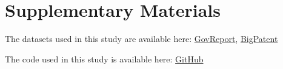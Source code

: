 

\section*{Supplementary Materials}

	The datasets used in this study are available here:
	\href{https://gov-report-data.github.io/}{GovReport},
	\href{https://evasharma.github.io/bigpatent/}{BigPatent}

	The code used in this study is available here:
	\href{https://github.com/NamanChhibbar/Long-Document-Summarizer.git}{GitHub}
